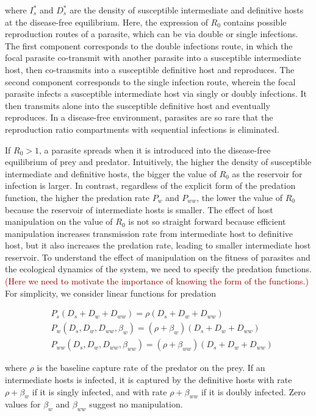 \documentclass[11pt]{article}
\newcommand{\cha}[1]{\textcolor{darkred}{(#1)}}
\begin{document}
where $I_s^*$ and $D_s^*$ are the density of susceptible intermediate and definitive hosts at the disease-free equilibrium. 
Here, the expression of $R_0$ contains possible reproduction routes of a parasite, which can be via double or single infections. 
The first component corresponds to the double infections route, in which the focal parasite co-transmit with another parasite into a susceptible intermediate host, then co-transmits into a susceptible definitive host and reproduces. 
The second component corresponds to the single infection route, wherein the focal parasite infects a susceptible intermediate host via singly or doubly infections. 
It then transmits alone into the susceptible definitive host and eventually reproduces. 
In a disease-free environment, parasites are so rare that the reproduction ratio compartments with sequential infections is eliminated. 


If $R_0 > 1$, a parasite spreads when it is introduced into the disease-free equilibrium of prey and predator.
Intuitively, the higher the density of susceptible intermediate and definitive hosts, the bigger the value of $R_0$ as the reservoir for infection is larger. In contrast, regardless of the explicit form of the predation function, the higher the predation rate $P_w$ and $P_{ww}$, the lower the value of $R_0$ because the reservoir of intermediate hosts is smaller. 
The effect of host manipulation on the value of $R_0$ is not so straight forward because efficient manipulation increases transmission rate from intermediate host to definitive host, but it also increases the predation rate, leading to smaller intermediate host reservoir. To understand the effect of manipulation on the fitness of parasites and the ecological dynamics of the system, we need to specify the predation functions. 
\cha{Here we need to motivate the importance of knowing the form of the functions.}
For simplicity, we consider linear functions for predation 

\begin{align*}
& P_s(D_s + D_w + D_{ww}) = \rho (D_s + D_w + D_{ww}) \\
& P_w(D_s, D_w, D_{ww}, \beta_w) = (\rho + \beta_w) (D_s + D_w + D_{ww}) \\
& P_{ww}(D_s, D_w, D_{ww}, \beta_{ww}) =  (\rho + \beta_{ww}) (D_s + D_w + D_{ww})
\end{align*}

where $\rho$ is the baseline capture rate of the predator on the prey. If an intermediate hosts is infected, it is captured by the definitive hosts with rate $\rho + \beta_w$ if it is singly infected, and with rate $\rho + \beta_{ww}$ if it is doubly infected. Zero values for $\beta_w$ and $\beta_{ww}$ suggest no manipulation. 
\end{document}
